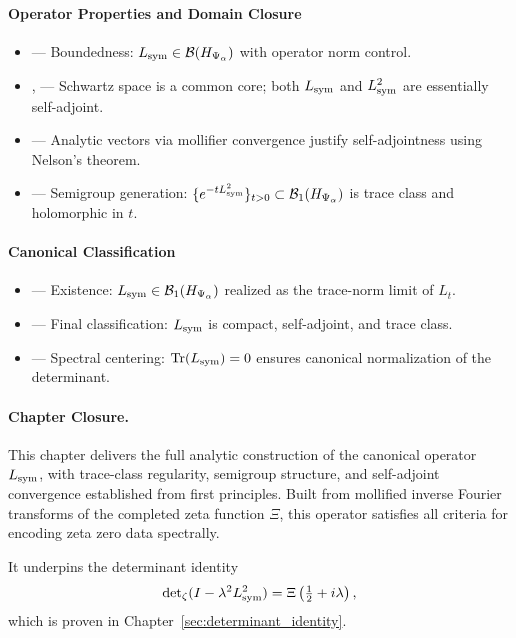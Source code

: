 \paragraph{Operator Properties and Domain Closure}
\begin{itemize}
  \item {} — Boundedness: \( L_{\mathrm{sym}} \in \mathcal{B}(H_{\Psi_\alpha}) \) with operator norm control.
  \item {},  — Schwartz space is a common core; both \( L_{\mathrm{sym}} \) and \( L_{\mathrm{sym}}^2 \) are essentially self-adjoint.
  \item {} — Analytic vectors via mollifier convergence justify self-adjointness using Nelson’s theorem.
  \item {} — Semigroup generation: \( \{ e^{-t L_{\mathrm{sym}}^2} \}_{t > 0} \subset \mathcal{B}_1(H_{\Psi_\alpha}) \) is trace class and holomorphic in \( t \).
\end{itemize}

\paragraph{Canonical Classification}
\begin{itemize}
  \item {} — Existence: \( L_{\mathrm{sym}} \in \mathcal{B}_1(H_{\Psi_\alpha}) \) realized as the trace-norm limit of \( L_t \).
  \item {} — Final classification: \( L_{\mathrm{sym}} \) is compact, self-adjoint, and trace class.
  \item {} — Spectral centering: \( \operatorname{Tr}(L_{\mathrm{sym}}) = 0 \) ensures canonical normalization of the determinant.
\end{itemize}

\paragraph{Chapter Closure.}
This chapter delivers the full analytic construction of the canonical operator \( L_{\mathrm{sym}} \), with trace-class regularity, semigroup structure, and self-adjoint convergence established from first principles. Built from mollified inverse Fourier transforms of the completed zeta function \( \Xi \), this operator satisfies all criteria for encoding zeta zero data spectrally.

It underpins the determinant identity
\[
\det\nolimits_{\zeta}(I - \lambda^2 L_{\mathrm{sym}}^2) = \Xi\left(\tfrac{1}{2} + i\lambda\right),
\]
which is proven in Chapter~\ref{sec:determinant_identity}.
